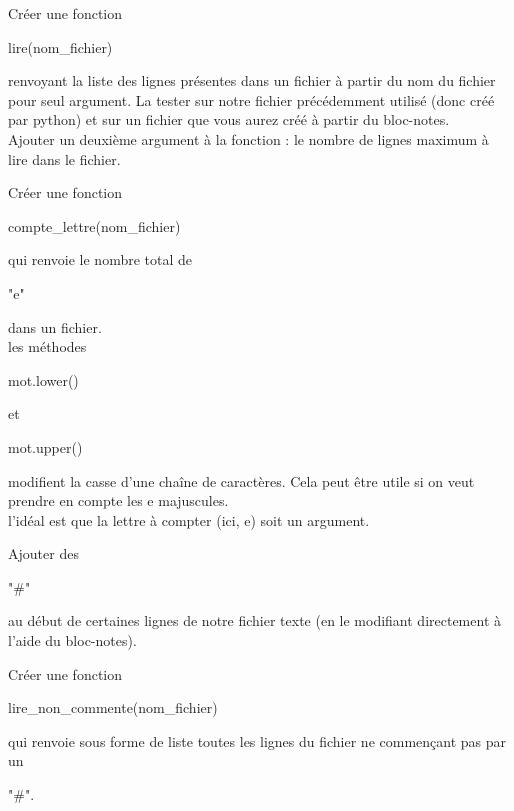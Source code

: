\begin{enonce}
	[Lecture $++$]

	\ques Créer une fonction \begin{texttt}lire(nom\_fichier)\end{texttt} renvoyant la liste des lignes présentes dans un fichier à partir du nom du fichier pour seul argument. La tester sur notre fichier précédemment utilisé (donc créé par python) et sur un fichier que vous aurez créé à partir du bloc-notes.\\

	 Ajouter un deuxième argument à la fonction : le nombre de lignes maximum à lire dans le fichier.

	\ques Créer une fonction \begin{texttt}compte\_lettre(nom\_fichier)\end{texttt} qui renvoie le nombre total de \begin{texttt}"e"\end{texttt} dans un fichier.
	\\

	 les méthodes \begin{texttt}mot.lower()\end{texttt} et \begin{texttt}mot.upper()\end{texttt} modifient la casse d'une chaîne de caractères. Cela peut être utile si on veut prendre en compte les e majuscules.
	\\

	  l'idéal est que la lettre à compter (ici, e) soit un argument.

	\ques Ajouter des \begin{texttt}"\#"\end{texttt} au début de certaines lignes de notre fichier texte (en le modifiant directement à l'aide du bloc-notes).

	Créer une fonction \begin{texttt}lire\_non\_commente(nom\_fichier)\end{texttt} qui renvoie sous forme de liste toutes les lignes du fichier ne commençant pas par un \begin{texttt}"\#".\end{texttt}

\end{enonce}

\begin{correction}

\end{correction}

